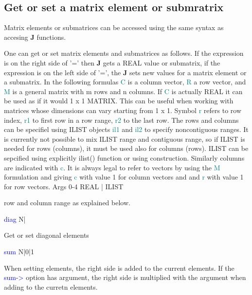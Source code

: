 \subsection{Get or set a matrix element or submratrix}
\label{getelem}
Matrix elements or submatrices can be accessed using the same syntax as
accesing \textbf{J} functions.

One can get or set matrix elements and submatrices as follows. If the expression
is on the right side of '=' then \textbf{J} gets a REAL value or submatrix, if the expression
is on the left side of '=', the \textbf{J} sets new values for a matrix element or a submatrix.
In the following formulas \textcolor{teal}{C} is a column vector, \textcolor{teal}{R} a row vector, and \textcolor{teal}{M} is
a general matrix with m rows and n columns.
If \textcolor{teal}{C} is actually REAL it can
be used as if it would 1 x 1 MATRIX. This can be useful when working with
matrices whose dimensions can vary starting from 1 x 1. Symbol \textcolor{teal}{r} refers to
row index, \textcolor{teal}{r1} to first row in a row range, \textcolor{teal}{r2} to the last row. The rows and
columns can be specifiel using ILIST objects \textcolor{teal}{il1} and \textcolor{teal}{il2} to specify noncontiguous ranges.
It is currently not possible to mix ILIST range and contiguous range, so if ILIST
is needed for rows (columns), it must be used also for columns (rows). ILIST can be
sepcified using explicitly \textcolor{VioletRed}{ilist}() function or using {} construction.
Similarly columns are indicated  with \textcolor{teal}{c}. It is always legal to refer to
vectors by using the \textcolor{teal}{M} formulation and giving \textcolor{teal}{c} with value 1 for column vectors and
and \textcolor{teal}{r} with value 1 for row vectors.
\vspace{0.3cm}
\hline
\vspace{0.3cm}
\noindent Args \tabto{3cm} 0-4 \tabto{5cm}  REAL | ILIST \tabto{7cm}
\begin{changemargin}{3cm}{0cm}
\noindent row and column range as explained below.
\end{changemargin}
\vspace{0.3cm}
\hline
\vspace{0.3cm}
\noindent \textcolor{blue}{diag} \tabto{3cm} N| \tabto{5cm}    \tabto{7cm}
\begin{changemargin}{3cm}{0cm}
\noindent Get or set diagonal elements
\end{changemargin}
\vspace{0.3cm}
\hline
\vspace{0.3cm}
\noindent \textcolor{blue}{sum} \tabto{3cm} N|0|1 \tabto{5cm}    \tabto{7cm}
\begin{changemargin}{3cm}{0cm}
\noindent  When setting elements, the right side is added to the current elements. If the
\textcolor{blue}{sum->} option has argument, the right side is multiplied with the argument when adding to the curretn elements.
\end {changemargin}
\hline
\vspace{0.2cm}

